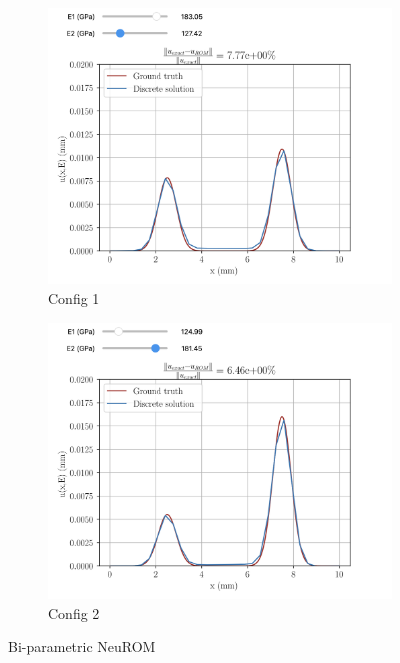 \begin{figure}
    \begin{subfigure}[t]{0.5\linewidth}
        \centering
        \includegraphics[width=\linewidth]{Figures/BiPara1.png}
        \caption{Config 1}
    \end{subfigure}
    \begin{subfigure}[t]{0.5\linewidth}
        \centering
        \includegraphics[width=\linewidth]{Figures/BiPara2.png}
        \caption{Config 2}
    \end{subfigure}
    \caption{Bi-parametric NeuROM}
    \label{fig:BiParam}
\end{figure}

